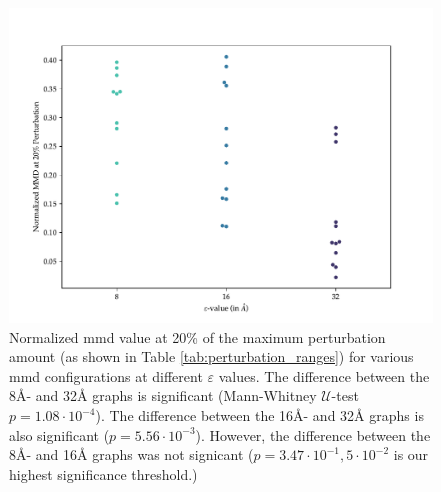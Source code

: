 \begin{figure}
  \centering
  \includegraphics[width=\textwidth]{./figures/results/swarmplot_2_1.pdf}
  \caption[Normalized \gls{mmd} value at 20\% of the maximum perturbation amount for
various \gls{mmd} configurations at different $\varepsilon$ values.]{Normalized \gls{mmd}
value at 20\% of the maximum perturbation amount (as shown in Table
\ref{tab:perturbation_ranges}) for various \gls{mmd} configurations at different
$\varepsilon$ values. The difference between the 8\si{\angstrom}- and
32\si{\angstrom} graphs is significant (Mann-Whitney $\mathcal{U}$-test
$p=1.08\cdot 10^{-4}$). The difference between the 16\si{\angstrom}- and
32\si{\angstrom} graphs is also significant ($p=5.56\cdot 10^{-3}$). However,
the difference between the 8\si{\angstrom}- and 16\si{\angstrom} graphs was not
signicant ($p=3.47\cdot 10^{-1}, 5\cdot 10^{-2}$ is our highest significance
threshold.)}
  \label{fig:difference_sensitivity_20_percent}
\end{figure}

\clearpage





